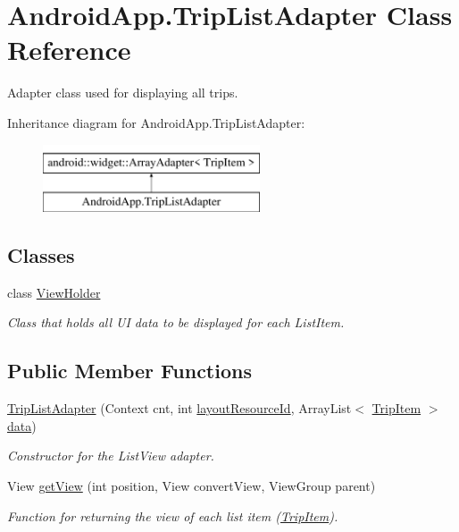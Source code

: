 \hypertarget{class_android_app_1_1_trip_list_adapter}{}\section{Android\+App.\+Trip\+List\+Adapter Class Reference}
\label{class_android_app_1_1_trip_list_adapter}


Adapter class used for displaying all trips.  


Inheritance diagram for Android\+App.\+Trip\+List\+Adapter\+:\begin{figure}[H]
\begin{center}
\leavevmode
\includegraphics[height=2.000000cm]{class_android_app_1_1_trip_list_adapter}
\end{center}
\end{figure}
\subsection*{Classes}
\begin{DoxyCompactItemize}
\item 
class \hyperlink{class_android_app_1_1_trip_list_adapter_1_1_view_holder}{View\+Holder}
\begin{DoxyCompactList}\small\item\em Class that holds all UI data to be displayed for each List\+Item. \end{DoxyCompactList}\end{DoxyCompactItemize}
\subsection*{Public Member Functions}
\begin{DoxyCompactItemize}
\item 
\hyperlink{class_android_app_1_1_trip_list_adapter_ad8d8c6f5a394a8d7e6e97d5bf239af76}{Trip\+List\+Adapter} (Context cnt, int \hyperlink{class_android_app_1_1_trip_list_adapter_a57cb58f32f3b9ea25c6330a821cb8455}{layout\+Resource\+Id}, Array\+List$<$ \hyperlink{class_android_app_1_1_trip_item}{Trip\+Item} $>$ \hyperlink{class_android_app_1_1_trip_list_adapter_a8cea45e06b19821352bce2de9b3e3941}{data})
\begin{DoxyCompactList}\small\item\em Constructor for the List\+View adapter. \end{DoxyCompactList}\item 
View \hyperlink{class_android_app_1_1_trip_list_adapter_aecaed2759c3d4753c8472cef9e731b01}{get\+View} (int position, View convert\+View, View\+Group parent)
\begin{DoxyCompactList}\small\item\em Function for returning the view of each list item (\hyperlink{class_android_app_1_1_trip_item}{Trip\+Item}). \end{DoxyCompactList}\end{DoxyCompactItemize}
